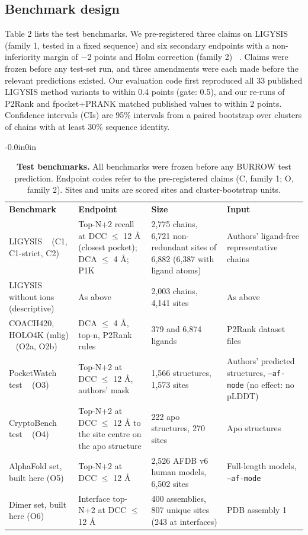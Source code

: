 \documentclass[10pt,letterpaper]{article}
\newlength\savedwidth
\newcommand\thickhline{\noalign{\global\savedwidth\arrayrulewidth\global\arrayrulewidth 2pt}%
\hline
\noalign{\global\arrayrulewidth\savedwidth}}
\begin{document}
\subsection*{Benchmark design}

Table 2 lists the test benchmarks. We pre-registered three claims on LIGYSIS (family 1, tested in a fixed sequence) and six secondary endpoints with a non-inferiority margin of $-$2 points and Holm correction (family 2) ~\cite{holm1979}. Claims were frozen before any test-set run, and three amendments were each made before the relevant predictions existed. Our evaluation code first reproduced all 33 published LIGYSIS method variants to within 0.4 points (gate: 0.5), and our re-runs of P2Rank and fpocket+PRANK matched published values to within 2 points. Confidence intervals (CIs) are 95\% intervals from a paired bootstrap over clusters of chains with at least 30\% sequence identity.

\begin{table}[!ht]
\begin{adjustwidth}{-0.0in}{0in}
\centering
\caption{{\bf Test benchmarks.} All benchmarks were frozen before any BURROW test prediction. Endpoint codes refer to the pre-registered claims (C, family 1; O, family 2). Sites and units are scored sites and cluster-bootstrap units.}
\label{table_benchmarks}
{\footnotesize
\begin{tabular}{p{3.0cm}p{4.2cm}p{3.0cm}p{4.0cm}}
\hline
\textbf{Benchmark} & \textbf{Endpoint} & \textbf{Size} & \textbf{Input} \\ \thickhline
LIGYSIS ~\cite{utges2024} (C1, C1-strict, C2) & Top-N+2 recall at DCC $\le$ 12 \AA{} (closest pocket); DCA $\le$ 4 \AA{}; P1K & 2,775 chains, 6,721 non-redundant sites of 6,882 (6,387 with ligand atoms) & Authors' ligand-free representative chains \\ \hline
LIGYSIS without ions (descriptive) & As above & 2,003 chains, 4,141 sites & As above \\ \hline
COACH420, HOLO4K (mlig) ~\cite{krivak2018} (O2a, O2b) & DCA $\le$ 4 \AA{}, top-n, P2Rank rules & 379 and 6,874 ligands & P2Rank dataset files \\ \hline
PocketWatch test ~\cite{portnoi2026} (O3) & Top-N+2 at DCC $\le$ 12 \AA{}, authors' mask & 1,566 structures, 1,573 sites & Authors' predicted structures, \texttt{--af-mode} (no effect: no pLDDT) \\ \hline
CryptoBench test ~\cite{skrhak2025} (O4) & Top-N+2 at DCC $\le$ 12 \AA{} to the site centre on the apo structure & 222 apo structures, 270 sites & Apo structures \\ \hline
AlphaFold set, built here (O5) & Top-N+2 at DCC $\le$ 12 \AA{} & 2,526 AFDB v6 human models, 6,502 sites & Full-length models, \texttt{--af-mode} \\ \hline
Dimer set, built here (O6) & Interface top-N+2 at DCC $\le$ 12 \AA{} & 400 assemblies, 807 unique sites (243 at interfaces) & PDB assembly 1 \\ \hline
\end{tabular}}
\end{adjustwidth}
\end{table}
\end{document}
